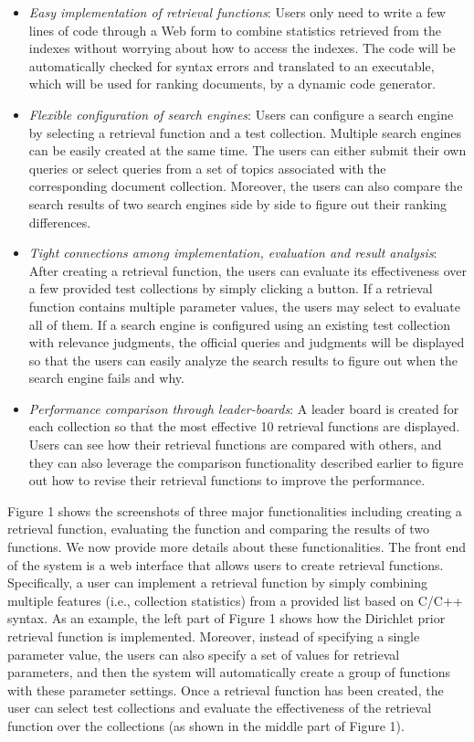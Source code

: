 \begin{itemize}
\item \textit{Easy implementation of retrieval functions}: 
Users only need to write a few lines of code through a Web form
to combine statistics retrieved from the indexes without 
worrying about how to access the indexes. The code will be 
automatically checked for syntax errors and translated to an 
executable, which will be used for ranking documents, 
by a dynamic code generator.
\item \textit{Flexible configuration of search engines}: 
Users can configure a search engine by selecting a retrieval 
function and a test collection. Multiple search engines can be
easily created at the same time. The users can either submit 
their own queries or select queries from a set of topics 
associated with the corresponding document collection. 
Moreover, the users can also compare the search results 
of two search engines side by side to figure out their 
ranking differences.
\item \textit{Tight connections among implementation, evaluation
and result analysis}: 
After creating a retrieval function, the users can evaluate its 
effectiveness over a few provided test collections by simply 
clicking a button. If a retrieval function contains multiple 
parameter values, the users may select to evaluate all of them. 
If a search engine is configured using an existing test collection 
with relevance judgments, the official queries and judgments 
will be displayed so that the users can easily analyze the search 
results to figure out when the search engine fails and why.
\item \textit{Performance comparison through leader-boards}: 
A leader board is created for each collection so that the most
effective 10 retrieval functions are displayed. Users
can see how their retrieval functions are compared with
others, and they can also leverage the comparison functionality 
described earlier to figure out how to revise
their retrieval functions to improve the performance.
\end{itemize}


Figure 1 shows the screenshots of three major functionalities 
including creating a retrieval function, evaluating the
function and comparing the results of two functions. We
now provide more details about these functionalities.
The front end of the system is a web interface that allows
users to create retrieval functions. Specifically, a user can
implement a retrieval function by simply combining multiple
features (i.e., collection statistics) from a provided list based
on C/C++ syntax. As an example, the left part of Figure 1
shows how the Dirichlet prior retrieval function is implemented. 
Moreover, instead of specifying a single parameter
value, the users can also specify a set of values for retrieval
parameters, and then the system will automatically create
a group of functions with these parameter settings. Once
a retrieval function has been created, the user can select
test collections and evaluate the effectiveness of the retrieval
function over the collections (as shown in the middle part of
Figure 1).

